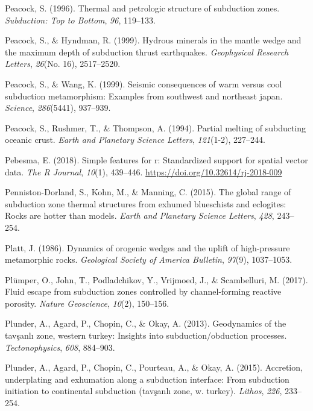 \begin{CSLReferences}{1}{1}
\leavevmode{}%
Peacock, S. (1996). Thermal and petrologic structure of subduction zones. \emph{Subduction: Top to Bottom}, \emph{96}, 119--133.

\leavevmode{}%
Peacock, S., \& Hyndman, R. (1999). Hydrous minerals in the mantle wedge and the maximum depth of subduction thrust earthquakes. \emph{Geophysical Research Letters}, \emph{26}(No. 16), 2517--2520.

\leavevmode{}%
Peacock, S., \& Wang, K. (1999). Seismic consequences of warm versus cool subduction metamorphism: Examples from southwest and northeast japan. \emph{Science}, \emph{286}(5441), 937--939.

\leavevmode{}%
Peacock, S., Rushmer, T., \& Thompson, A. (1994). Partial melting of subducting oceanic crust. \emph{Earth and Planetary Science Letters}, \emph{121}(1-2), 227--244.

\leavevmode{}%
Pebesma, E. (2018). Simple features for r: Standardized support for spatial vector data. \emph{The R Journal}, \emph{10}(1), 439--446. \url{https://doi.org/10.32614/rj-2018-009}

\leavevmode{}%
Penniston-Dorland, S., Kohn, M., \& Manning, C. (2015). The global range of subduction zone thermal structures from exhumed blueschists and eclogites: Rocks are hotter than models. \emph{Earth and Planetary Science Letters}, \emph{428}, 243--254.

\leavevmode{}%
Platt, J. (1986). Dynamics of orogenic wedges and the uplift of high-pressure metamorphic rocks. \emph{Geological Society of America Bulletin}, \emph{97}(9), 1037--1053.

\leavevmode{}%
Plümper, O., John, T., Podladchikov, Y., Vrijmoed, J., \& Scambelluri, M. (2017). Fluid escape from subduction zones controlled by channel-forming reactive porosity. \emph{Nature Geoscience}, \emph{10}(2), 150--156.

\leavevmode{}%
Plunder, A., Agard, P., Chopin, C., \& Okay, A. (2013). Geodynamics of the tav{ş}anl{ı} zone, western turkey: Insights into subduction/obduction processes. \emph{Tectonophysics}, \emph{608}, 884--903.

\leavevmode{}%
Plunder, A., Agard, P., Chopin, C., Pourteau, A., \& Okay, A. (2015). Accretion, underplating and exhumation along a subduction interface: From subduction initiation to continental subduction (tav{ş}anl{ı} zone, w. turkey). \emph{Lithos}, \emph{226}, 233--254.


\end{CSLReferences}
